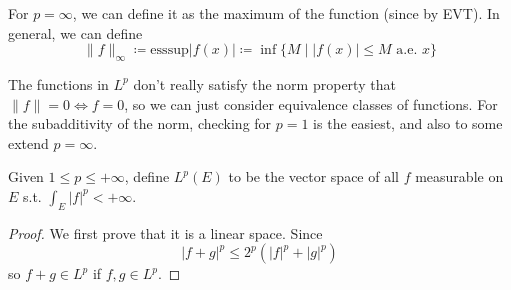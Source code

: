   For $p = \infty$, we can define it as the maximum of the function (since by EVT). In general, we can define 
  \begin{equation}
    \|f\|_{\infty} \coloneqq \mathrm{esssup} |f(x)| \coloneqq \inf \{ M \mid |f(x)| \leq M \text{ a.e. } x\}
  \end{equation}

  The functions in $L^p$ don't really satisfy the norm property that $\|f\| = 0 \iff f =0$, so we can just consider equivalence classes of functions. For the subadditivity of the norm, checking for $p=1$ is the easiest, and also to some extend $p=\infty$. 

  \begin{definition}[Lp Space]
    Given $1 \leq p \leq +\infty$, define $L^p (E)$ to be the vector space of all $f$ measurable on $E$ s.t. $\int_E |f|^p < +\infty$. 
  \end{definition}
  \begin{proof}
    We first prove that it is a linear space. Since 
    \begin{equation}
      | f + g |^p \leq 2^p (|f|^p + |g|^p)
    \end{equation}
    so $f + g \in L^p$ if $f, g \in L^p$. 
  \end{proof}

